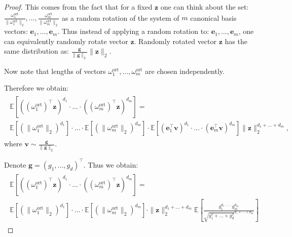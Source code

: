 \begin{proof}
This comes from the fact that for a fixed $\mathbf{z}$ one can think about the set:
$\frac{\omega_{1}^{\mathrm{ort}}}{\|\omega_{1}^{\mathrm{ort}}\|_{2}},...,\frac{\omega_{m}^{\mathrm{ort}}}{\|\omega_{m}^{\mathrm{ort}}\|_{2}}$ as a random rotation of the system of $m$ canonical basis vectors: $\mathbf{e}_{1},...,\mathbf{e}_{m}$.
Thus instead of applying a random rotation to: $\mathbf{e}_{1},...,\mathbf{e}_{m}$, one can equivalently randomly rotate vector $\mathbf{z}$. Randomly rotated vector $\mathbf{z}$ has the same distribution as: $\frac{\mathbf{g}}{\|\mathbf{g}\|_{2}}\|\mathbf{z}\|_{2}$. 


Now note that lengths of vectors $\omega_{1}^{\mathrm{ort}},...,\omega_{m}^{\mathrm{ort}}$ are chosen independently.

Therefore we obtain:
\begin{align}
\begin{split}
\mathbb{E}[((\omega_{1}^{\mathrm{ort}})^{\top}\mathbf{z})^{d_{1}} \cdot ... \cdot ((\omega_{m}^{\mathrm{ort}})^{\top}\mathbf{z})^{d_{m}}] = \\ \mathbb{E}[(\|\omega_{1}^{\mathrm{ort}}\|_{2})^{d_{1}}] \cdot ... \cdot \mathbb{E}[(\|\omega_{m}^{\mathrm{ort}}\|_{2})^{d_{m}}] \cdot \mathbb{E}[(\mathbf{e}_{1}^{\top}\mathbf{v})^{d_{1}} \cdot ... \cdot (\mathbf{e}_{m}^{\top}\mathbf{v})^{d_{m}}]
\|\mathbf{z}\|_{2}^{d_{1}+...+d_{m}},
\end{split}
\end{align}
where $\mathbf{v} \sim \frac{\mathbf{g}}{\|\mathbf{g}\|_{2}}$.

Denote $\mathbf{g}=(g_{1},...,g_{d})^{\top}$.
Thus we obtain:
\begin{align}
\begin{split}
\label{lhs}
\mathbb{E}[((\omega_{1}^{\mathrm{ort}})^{\top}\mathbf{z})^{d_{1}} \cdot ... \cdot ((\omega_{m}^{\mathrm{ort}})^{\top}\mathbf{z})^{d_{m}}] = \\ \mathbb{E}[(\|\omega_{1}^{\mathrm{ort}}\|_{2})^{d_{1}}] \cdot ... \cdot \mathbb{E}[(\|\omega_{m}^{\mathrm{ort}}\|_{2})^{d_{m}}] \cdot 
\|\mathbf{z}\|_{2}^{d_{1}+...+d_{m}} \mathbb{E}[\frac{g_{1}^{d_{1} \cdot ... \cdot}g_{m}^{d_{m}}}{\sqrt{g_{1}^{2}+...+g_{d}^{2}}^{d_{1}+...+d_{m}}}]
\end{split}
\end{align}


\end{proof}
